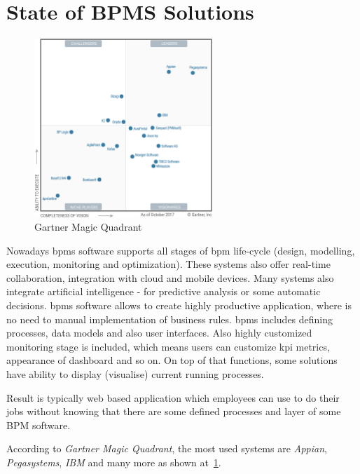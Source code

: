 \section{State of BPMS Solutions}


\begin{figure}[ht!]
	\centering
    \includegraphics[width=0.6\textwidth, keepaspectratio]{img/gartner-magic-quadrant.png}
    \caption{Gartner Magic Quadrant\cite{gartner-2017} }
    \label{fig:gartner-magic-quadrant}
\end{figure}

Nowadays \gls{bpms} software supports all stages of \gls{bpm} life-cycle (design, modelling, execution, monitoring and optimization). These systems also offer real-time collaboration, integration with cloud and mobile devices. Many systems also integrate artificial intelligence - for predictive analysis or some automatic decisions. \gls{bpms} software allows to create highly productive application, where is no need to manual implementation of business rules. \gls{bpms} includes defining processes, data models and also user interfaces. Also highly customized monitoring stage is included, which means users can customize \gls{kpi} metrics, appearance of dashboard and so on. On top of that functions, some solutions have ability to display (visualise) current running processes.  

Result is typically web based application which employees can use to do their jobs without knowing that there are some defined processes and layer of some BPM software. 

According to \textit{Gartner Magic Quadrant}\cite{gartner-2017}, the most used systems are \textit{Appian}, \textit{Pegasystems}, \textit{IBM} and many more as shown at~\cref{fig:gartner-magic-quadrant}.

